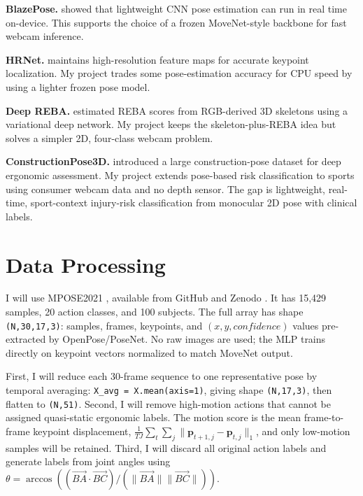 \documentclass[final]{article}
\begin{document}
\textbf{BlazePose.} \citet{bazarevsky2020blazepose} showed that lightweight CNN pose estimation can run in real time on-device. This supports the choice of a frozen MoveNet-style backbone for fast webcam inference.

\textbf{HRNet.} \citet{sun2019hrnet} maintains high-resolution feature maps for accurate keypoint localization. My project trades some pose-estimation accuracy for CPU speed by using a lighter frozen pose model.

\textbf{Deep REBA.} \citet{chatzis2022automatic} estimated REBA scores from RGB-derived 3D skeletons using a variational deep network. My project keeps the skeleton-plus-REBA idea but solves a simpler 2D, four-class webcam problem.

\textbf{ConstructionPose3D.} \citet{fan2024cp3d} introduced a large construction-pose dataset for deep ergonomic assessment. My project extends pose-based risk classification to sports using consumer webcam data and no depth sensor. The gap is lightweight, real-time, sport-context injury-risk classification from monocular 2D pose with clinical labels.

\section*{Data Processing}
I will use MPOSE2021 \citep{mazzia2021action,mpose2021zenodo}, available from GitHub and Zenodo \citep{pic4ser2021mpose}. It has 15,429 samples, 20 action classes, and 100 subjects. The full array has shape \texttt{(N,30,17,3)}: samples, frames, keypoints, and $(x,y,confidence)$ values pre-extracted by OpenPose/PoseNet. No raw images are used; the MLP trains directly on keypoint vectors normalized to match MoveNet output.

First, I will reduce each 30-frame sequence to one representative pose by temporal averaging: \texttt{X\_avg = X.mean(axis=1)}, giving shape \texttt{(N,17,3)}, then flatten to \texttt{(N,51)}. Second, I will remove high-motion actions that cannot be assigned quasi-static ergonomic labels. The motion score is the mean frame-to-frame keypoint displacement, $\frac{1}{TJ}\sum_t\sum_j \|\mathbf{p}_{t+1,j}-\mathbf{p}_{t,j}\|_1$, and only low-motion samples will be retained. Third, I will discard all original action labels and generate labels from joint angles using $\theta=\arccos((\vec{BA}\cdot\vec{BC})/(\|\vec{BA}\|\|\vec{BC}\|))$.
\end{document}
